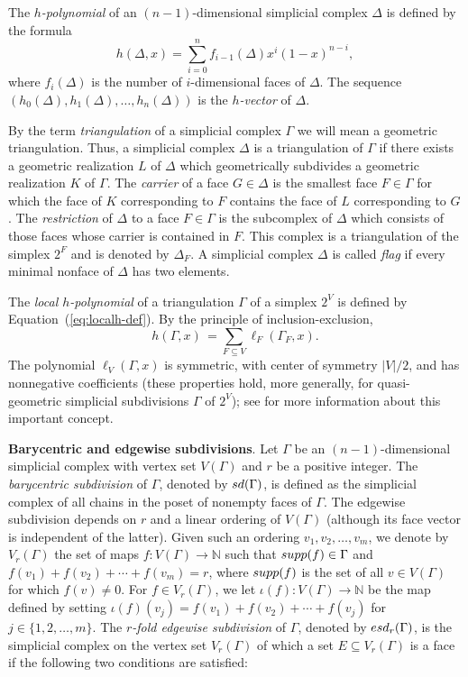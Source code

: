 \documentclass[11pt]{amsart}
\newcommand{\esd}{{\rm esd}}
\newcommand{\sd}{{\rm sd}}
\newcommand{\supp}{{\rm supp}}
\newcommand{\NN}{{\mathbb N}}
\renewcommand{\to}{\rightarrow}
\begin{document}
The \emph{$h$-polynomial} of an 
$(n-1)$-dimensional simplicial complex $\Delta$ 
is defined by the formula
%
\begin{equation}
\label{eq:hdef}
h(\Delta, x) = \sum_{i=0}^n f_{i-1} (\Delta) x^i 
(1-x)^{n-i}, 
\end{equation}
%
where $f_i(\Delta)$ is the number of $i$-dimensional 
faces of $\Delta$. The sequence $(h_0(\Delta), 
h_1(\Delta),\dots,h_n(\Delta))$ is the 
\emph{$h$-vector} of $\Delta$. 

By the term \emph{triangulation} of a simplicial 
complex $\Gamma$ we will mean a geometric 
triangulation. Thus, a simplicial complex $\Delta$ 
is a triangulation of $\Gamma$ if there exists a 
geometric realization $L$ of $\Delta$ which 
geometrically subdivides a geometric realization 
$K$ of $\Gamma$. The \emph{carrier} of a face 
$G \in \Delta$ is the smallest face 
$F \in \Gamma$ for which the face of $K$ 
corresponding to $F$ contains the face of $L$ 
corresponding to $G$. The \emph{restriction} of 
$\Delta$ to a face $F \in \Gamma$ is the 
subcomplex of $\Delta$ which consists of those 
faces whose carrier is contained in $F$. This 
complex is a triangulation of the simplex $2^F$
and is denoted by $\Delta_F$. A simplicial 
complex $\Delta$ is called \emph{flag} if every
minimal nonface of $\Delta$ has two elements.

The \emph{local $h$-polynomial} of a 
triangulation $\Gamma$ of a simplex $2^V$ is 
defined by Equation~(\ref{eq:localh-def}). By the 
principle of inclusion-exclusion, 
%
\begin{equation} \label{eq:h-localh}
  h (\Gamma, x) \, = \sum_{F \subseteq V} 
  \ell_F (\Gamma_F, x).
\end{equation}
%
The polynomial $\ell_V (\Gamma, x)$ is symmetric, 
with center of symmetry $|V|/2$, and has 
nonnegative coefficients (these properties hold,
more generally, for quasi-geometric simplicial 
subdivisions $\Gamma$ of $2^V$); see \cite{Sta92} 
\cite[Section~III.10]{StaCCA} for more information 
about this important concept. 

\medskip
\noindent
\textbf{Barycentric and edgewise subdivisions}. 
Let $\Gamma$ be an $(n-1)$-dimensional simplicial 
complex with vertex set $V(\Gamma)$ and $r$ be a 
positive integer. The \emph{barycentric subdivision} 
of $\Gamma$, denoted by $\sd(\Gamma)$, is 
defined as the simplicial complex of all chains in 
the poset of nonempty faces of $\Gamma$. The edgewise 
subdivision depends on $r$ and a linear ordering of 
$V(\Gamma)$ (although its face vector is independent 
of the latter). Given such an ordering 
$v_1, v_2,\dots,v_m$, we denote by $V_r(\Gamma)$ the 
set of maps $f: V(\Gamma) \to \NN$ such that 
$\supp(f) \in \Gamma$ and $f(v_1) + f(v_2) + \cdots + 
f(v_m) = r$, where $\supp(f)$ is the set of all 
$v \in V(\Gamma)$ for which $f(v) \ne 0$. For $f \in 
V_r(\Gamma)$, we let $\iota(f): V(\Gamma) \to \NN$ be 
the map defined by setting $\iota(f)(v_j) = f(v_1) + 
f(v_2) + \cdots + f(v_j)$ for $j \in \{1, 2,\dots,m\}$. 
The \emph{$r$-fold edgewise subdivision} of $\Gamma$, 
denoted by $\esd_r(\Gamma)$, is the simplicial complex  
on the vertex set $V_r(\Gamma)$ of which a set 
$E \subseteq V_r(\Gamma)$ is a face if the following 
two conditions are satisfied:
\end{document}
